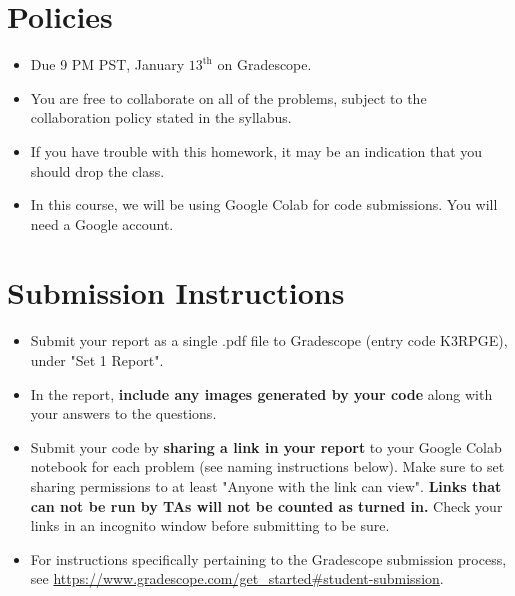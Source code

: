 \newif\ifshowsolutions
\showsolutionstrue





\pagestyle{fancy}




\section*{Policies}
\begin{itemize}
	\item Due 9 PM PST, January $13^\text{th}$ on Gradescope. 
	\item You are free to collaborate on all of the problems, subject to the collaboration policy stated in the syllabus.
	\item If you have trouble with this homework, it may be an indication that you should drop the class.
	\item In this course, we will be using Google Colab for code submissions. You will need a Google account.
\end{itemize}

\section*{Submission Instructions}

\begin{itemize}
	\item Submit your report as a single .pdf file to Gradescope (entry code K3RPGE), under "Set 1 Report". 
	\item In the report, \textbf{include any images generated by your code} along with your answers to the questions.
	\item Submit your code by \textbf{sharing a link in your report} to your Google Colab notebook for each problem (see naming instructions below). Make sure to set sharing permissions to at least "Anyone with the link can view". \textbf{Links that can not be run by TAs will not be counted as turned in.} Check your links in an incognito window before submitting to be sure. 
	\item For instructions specifically pertaining to the Gradescope submission process, see \url{https://www.gradescope.com/get_started#student-submission}.
\end{itemize}


